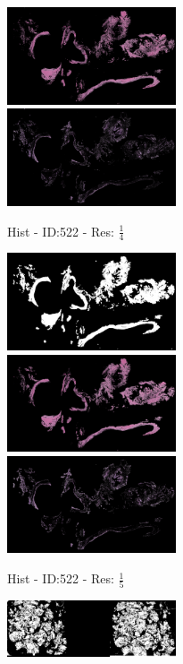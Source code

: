 \documentclass[letterpaper,10pt,oneside]{article}
\begin{document}
\begin{figure}[hbtp]
\begin{subfigure}[b]{5cm}
    \includegraphics[width=5cm]{visualization/results/histogramSeg/res_reduce_4/Region_1_PO13-00522A1_1_2_201305171639.png}
    \includegraphics[width=5cm]{visualization/results/histogramSeg/res_reduce_4/Region_2_PO13-00522A1_1_2_201305171639.png}
    \caption{Hist - ID:522 - Res: $\frac{1}{4}$}
  \end{subfigure}
  \begin{subfigure}[b]{5cm}
    \includegraphics[width=5cm]{visualization/results/histogramSeg/res_reduce_5/Region_0_PO13-00522A1_1_2_201305171639.png}
    \includegraphics[width=5cm]{visualization/results/histogramSeg/res_reduce_5/Region_1_PO13-00522A1_1_2_201305171639.png}
    \includegraphics[width=5cm]{visualization/results/histogramSeg/res_reduce_5/Region_2_PO13-00522A1_1_2_201305171639.png}
    \caption{Hist - ID:522 - Res: $\frac{1}{5}$}
  \end{subfigure}
  \begin{subfigure}[b]{5cm}
    \includegraphics[width=5cm]{visualization/results/histogramSeg/res_reduce_3/Region_0_PO14-00482B3_1_2_201404171123.png}

\end{subfigure}
\end{figure}
\end{document}
